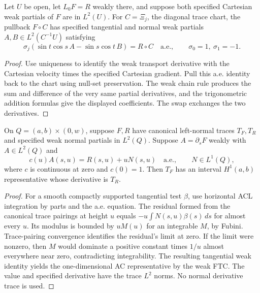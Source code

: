 \begin{lemma}
\label{lem:diagonal-boundary-transport}
\leanok
Let $U$ be open, let $L_0F=R$ weakly there, and suppose both specified
Cartesian weak partials of $F$ are in $L^2(U)$.
For $C=\Xi_j$, the diagonal trace chart, the pullback $F\circ C$ has
specified tangential and normal weak partials $A,B\in L^2(C^{-1}U)$
satisfying
\[
 \sigma_j(\sin t\cos s\,A-\sin s\cos t\,B)=R\circ C
 \quad\text{a.e.},\qquad \sigma_0=1,\ \sigma_1=-1 .
\]
\end{lemma}
\begin{proof}
\leanok
Use uniqueness to identify the weak transport derivative with the
Cartesian velocity times the specified Cartesian gradient. Pull
this a.e. identity back to the chart using null-set preservation.
The weak chain rule produces the sum and difference of the very same
partial derivatives, and the trigonometric addition formulas give
the displayed coefficients. The swap exchanges the two derivatives.
\end{proof}

\begin{lemma}
\label{lem:boundary-transport-ode}
\leanok
On $Q=(a,b)\times(0,w)$, suppose $F,R$ have canonical
left-normal traces $T_F,T_R$ and specified weak normal partials in $L^2(Q)$.
Suppose $A=\partial_s F$ weakly with $A\in L^2(Q)$ and
\[
 c(u) A(s,u)=R(s,u)+uN(s,u)\quad\text{a.e.},
 \qquad N\in L^1(Q),
\]
where $c$ is continuous at zero and $c(0)=1$.
Then $T_F$ has an interval $H^1(a,b)$ representative whose derivative is $T_R$.
\end{lemma}
\begin{proof}
\leanok
For a smooth compactly supported tangential test $\beta$, use horizontal
ACL integration by parts and the a.e. equation. The residual formed from
the canonical trace pairings at height $u$ equals
$-u\int N(s,u)\beta(s)\,ds$ for almost every $u$.
Its modulus is bounded by $uM(u)$ for an integrable $M$, by Fubini.
Trace-pairing convergence identifies the residual's limit at zero.
If the limit were nonzero, then $M$ would dominate a positive constant times
$1/u$ almost everywhere near zero, contradicting integrability.
The resulting tangential weak identity yields the one-dimensional AC
representative by the weak FTC. The value and specified derivative have the
trace $L^2$ norms. No normal derivative trace is used.
\end{proof}

